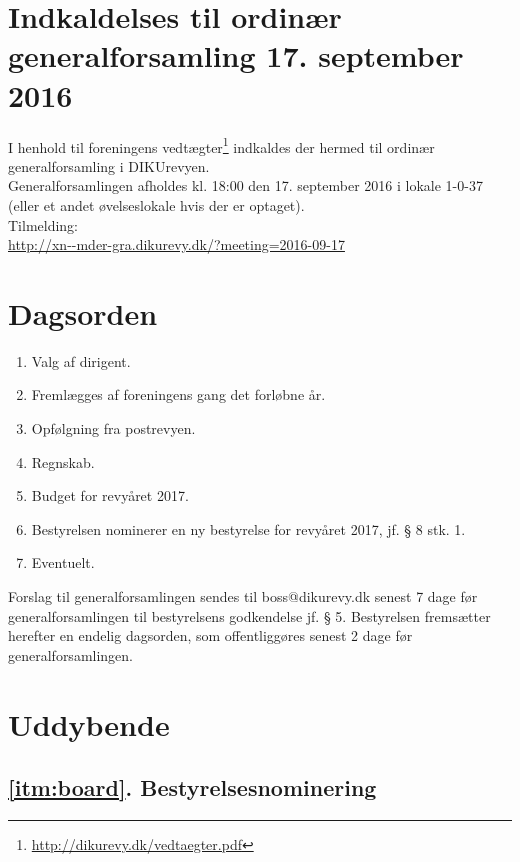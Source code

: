 \documentclass[a4paper,11pt]{report}
\begin{document}
\section*{Indkaldelses til ordinær generalforsamling 17. september 2016}

I henhold til foreningens vedtægter\footnote{\url{http://dikurevy.dk/vedtaegter.pdf}} indkaldes der hermed til
ordinær generalforsamling i DIKUrevyen. \\

\noindent Generalforsamlingen afholdes kl. 18:00 den 17. september 2016 i lokale
1-0-37 (eller et andet øvelseslokale hvis der er optaget). \\

\noindent Tilmelding:\\
\url{http://xn--mder-gra.dikurevy.dk/?meeting=2016-09-17}

\section*{Dagsorden}

\begin{enumerate}
\item Valg af dirigent.
\item Fremlægges af foreningens gang det forløbne år.
\item Opfølgning fra postrevyen.
\item Regnskab.
\item Budget for revyåret 2017.
\item \label{itm:board} Bestyrelsen nominerer en ny bestyrelse for revyåret 2017, jf. § 8 stk. 1.
\item Eventuelt.
\end{enumerate}

\noindent Forslag til generalforsamlingen sendes til boss@dikurevy.dk senest 7
dage før generalforsamlingen til bestyrelsens godkendelse jf. § 5.
Bestyrelsen fremsætter herefter en endelig dagsorden, som
offentliggøres senest 2 dage før generalforsamlingen.

\newpage

\section*{Uddybende}

\subsection*{\ref{itm:board}. Bestyrelsesnominering}
\end{document}
